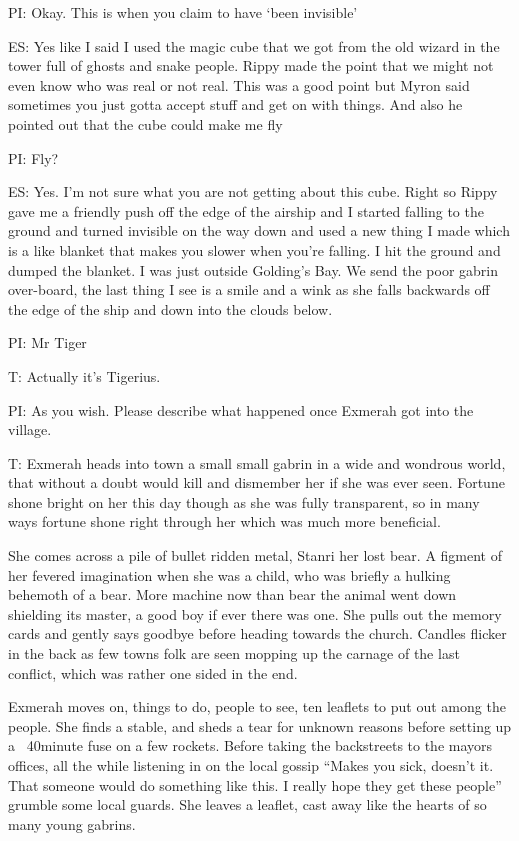 PI: Okay. This is when you claim to have ‘been invisible’\medskip

ES: Yes like I said I used the magic cube that we got from the old wizard in the tower full of ghosts and snake people. Rippy made the point that we might not even know who was real or not real. This was a good point but Myron said sometimes you just gotta accept stuff and get on with things. And also he pointed out that the cube could make me fly\medskip

PI: Fly?\medskip

ES: Yes. I’m not sure what you are not getting about this cube. Right so Rippy gave me a friendly push off the edge of the airship and I started falling to the ground and turned invisible on the way down and used a new thing I made which is a like blanket that makes you slower when you’re falling. I hit the ground and dumped the blanket. I was just outside Golding’s Bay. We send the poor gabrin over-board, the last thing I see is a smile and a wink as she falls backwards off the edge of the ship and down into the clouds below.\medskip

PI: Mr Tiger\medskip

T: Actually it’s Tigerius.\medskip

PI: As you wish. Please describe what happened once Exmerah got into the village.\medskip

T: Exmerah heads into town a small small gabrin in a wide and wondrous world, that without a doubt would kill and dismember her if she was ever seen. Fortune shone bright on her this day though as she was fully transparent, so in many ways fortune shone right through her which was much more beneficial.\medskip

She comes across a pile of bullet ridden metal, Stanri her lost bear. A figment of her fevered imagination when she was a child, who was briefly a hulking behemoth of a bear. More machine now than bear the animal went down shielding its master, a good boy if ever there was one. She pulls out the memory cards and gently says goodbye before heading towards the church. Candles flicker in the back as few towns folk are seen mopping up the carnage of the last conflict, which was rather one sided in the end.\medskip

Exmerah moves on, things to do, people to see, ten leaflets to put out among the people. She finds a stable, and sheds a tear for unknown reasons before setting up a ~40minute fuse on a few rockets. Before taking the backstreets to the mayors offices, all the while listening in on the local gossip “Makes you sick, doesn’t it. That someone would do something like this. I really hope they get these people” grumble some local guards. She leaves a leaflet, cast away like the hearts of so many young gabrins.\medskip

